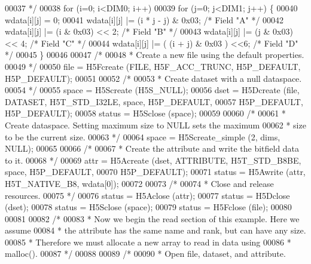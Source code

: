 \begin{DoxyCode}
00037 \textcolor{comment}{     */}
00038     \textcolor{keywordflow}{for} (i=0; i<DIM0; i++)
00039         \textcolor{keywordflow}{for} (j=0; j<DIM1; j++) \{
00040             wdata[i][j] = 0;
00041             wdata[i][j] |= (i * j - j) & 0x03;          \textcolor{comment}{/* Field "A" */}
00042             wdata[i][j] |= (i & 0x03) << 2;             \textcolor{comment}{/* Field "B" */}
00043             wdata[i][j] |= (j & 0x03) << 4;             \textcolor{comment}{/* Field "C" */}
00044             wdata[i][j] |= ( (i + j) & 0x03 ) <<6;      \textcolor{comment}{/* Field "D" */}
00045         \}
00046 
00047     \textcolor{comment}{/*}
00048 \textcolor{comment}{     * Create a new file using the default properties.}
00049 \textcolor{comment}{     */}
00050     file = H5Fcreate (FILE, H5F\_ACC\_TRUNC, H5P\_DEFAULT, H5P\_DEFAULT);
00051 
00052     \textcolor{comment}{/*}
00053 \textcolor{comment}{     * Create dataset with a null dataspace.}
00054 \textcolor{comment}{     */}
00055     space = H5Screate (H5S\_NULL);
00056     dset = H5Dcreate (file, DATASET, H5T\_STD\_I32LE, space, H5P\_DEFAULT,
00057                 H5P\_DEFAULT, H5P\_DEFAULT);
00058     status = H5Sclose (space);
00059 
00060     \textcolor{comment}{/*}
00061 \textcolor{comment}{     * Create dataspace.  Setting maximum size to NULL sets the maximum}
00062 \textcolor{comment}{     * size to be the current size.}
00063 \textcolor{comment}{     */}
00064     space = H5Screate\_simple (2, dims, NULL);
00065 
00066     \textcolor{comment}{/*}
00067 \textcolor{comment}{     * Create the attribute and write the bitfield data to it.}
00068 \textcolor{comment}{     */}
00069     attr = H5Acreate (dset, ATTRIBUTE, H5T\_STD\_B8BE, space, H5P\_DEFAULT,
00070                 H5P\_DEFAULT);
00071     status = H5Awrite (attr, H5T\_NATIVE\_B8, wdata[0]);
00072 
00073     \textcolor{comment}{/*}
00074 \textcolor{comment}{     * Close and release resources.}
00075 \textcolor{comment}{     */}
00076     status = H5Aclose (attr);
00077     status = H5Dclose (dset);
00078     status = H5Sclose (space);
00079     status = H5Fclose (file);
00080 
00081 
00082     \textcolor{comment}{/*}
00083 \textcolor{comment}{     * Now we begin the read section of this example.  Here we assume}
00084 \textcolor{comment}{     * the attribute has the same name and rank, but can have any size.}
00085 \textcolor{comment}{     * Therefore we must allocate a new array to read in data using}
00086 \textcolor{comment}{     * malloc().}
00087 \textcolor{comment}{     */}
00088 
00089     \textcolor{comment}{/*}
00090 \textcolor{comment}{     * Open file, dataset, and attribute.}

\end{DoxyCode}
